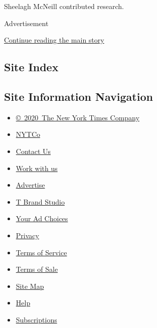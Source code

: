 Sheelagh McNeill contributed research.

Advertisement

\protect\hyperlink{after-bottom}{Continue reading the main story}

\hypertarget{site-index}{%
\subsection{Site Index}\label{site-index}}

\hypertarget{site-information-navigation}{%
\subsection{Site Information
Navigation}\label{site-information-navigation}}

\begin{itemize}
\tightlist
\item
  \href{https://help.nytimes.com/hc/en-us/articles/115014792127-Copyright-notice}{©~2020~The
  New York Times Company}
\end{itemize}

\begin{itemize}
\tightlist
\item
  \href{https://www.nytco.com/}{NYTCo}
\item
  \href{https://help.nytimes.com/hc/en-us/articles/115015385887-Contact-Us}{Contact
  Us}
\item
  \href{https://www.nytco.com/careers/}{Work with us}
\item
  \href{https://nytmediakit.com/}{Advertise}
\item
  \href{http://www.tbrandstudio.com/}{T Brand Studio}
\item
  \href{https://www.nytimes.com/privacy/cookie-policy\#how-do-i-manage-trackers}{Your
  Ad Choices}
\item
  \href{https://www.nytimes.com/privacy}{Privacy}
\item
  \href{https://help.nytimes.com/hc/en-us/articles/115014893428-Terms-of-service}{Terms
  of Service}
\item
  \href{https://help.nytimes.com/hc/en-us/articles/115014893968-Terms-of-sale}{Terms
  of Sale}
\item
  \href{https://spiderbites.nytimes.com}{Site Map}
\item
  \href{https://help.nytimes.com/hc/en-us}{Help}
\item
  \href{https://www.nytimes.com/subscription?campaignId=37WXW}{Subscriptions}
\end{itemize}
